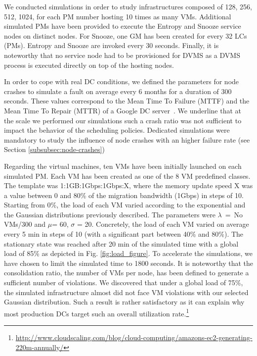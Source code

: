 We conducted simulations in order to study infrastructures composed of
128, 256, 512, 1024,
for each PM number hosting 10 times as many VMs. Additional simulated PMs have
been provided to execute the Entropy and Snooze service nodes on
distinct nodes. For Snooze, one GM has been created for every 32 LCs
(\ie PMs). Entropy and Snooze are invoked every 30 seconds. Finally,
it is noteworthy that no service node had to be provisioned for DVMS
as a DVMS process is executed directly on top of the hosting nodes.

In order to cope with real DC conditions, we defined the parameters
for node crashes to simulate a fault on average every 6 months for a
duration of 300 seconds. These values correspond to the Mean Time To
Failure (MTTF) and the Mean Time To Repair (MTTR) of a Google DC
server~\cite[pp. 107-108]{datacenterAsComputer}. We underline that at
the scale we performed our simulations such a crash ratio was not
sufficient to impact the behavior of the scheduling policies.
Dedicated simulations were mandatory to study the influence of node
crashes with an higher failure rate (see Section \ref{subsubsec:node-crashes})

Regarding the virtual machines, ten VMs have
been initially launched on each simulated PM.  Each VM has been
created as one of the 8 VM predefined classes. The template was
1:1GB:1Gbps:1Gbps:X, where the memory update speed X was a value
between 0 and 80\% of the migration bandwidth (1Gbps) in steps of
10. Starting from 0\%, the load of each VM varied according to the
exponential and the Gaussian distributions previously described. The
parameters were $\lambda$~=~No VMs/300 and $\mu$= 60, $\sigma$ = 20.
Concretely, the load of each VM varied on average every 5 min in steps
of 10 (with a significant part between 40\% and 80\%). The stationary
state was reached after 20 min of the simulated time with a global
load of 85\% as depicted in Fig. \ref{fig:load_figure}. To accelerate
the simulations, we have chosen to limit the simulated time to 1800
seconds. It is noteworthy that the consolidation ratio, \ie the number
of VMs per node, has been defined to generate a sufficient number of
violations. We discovered that under a global load of 75\%, the
simulated infrastructure almost did not face VM violations with our selected
Gaussian distribution. Such a result is rather satisfactory as it can
explain why most production DCs target such an overall utilization
rate.\footnote{\url{http://www.cloudscaling.com/blog/cloud-computing/amazons-ec2-generating-220m-annually/}}



